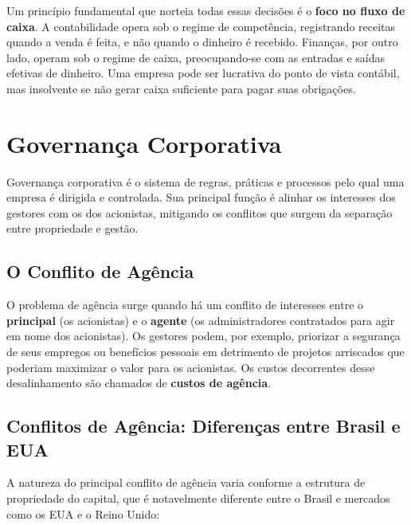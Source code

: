 \documentclass[
  a4paper,
]{book}
\begin{document}
Um princípio fundamental que norteia todas essas decisões é o
\textbf{foco no fluxo de caixa}. A contabilidade opera sob o regime de
competência, registrando receitas quando a venda é feita, e não quando o
dinheiro é recebido. Finanças, por outro lado, operam sob o regime de
caixa, preocupando-se com as entradas e saídas efetivas de dinheiro. Uma
empresa pode ser lucrativa do ponto de vista contábil, mas insolvente se
não gerar caixa suficiente para pagar suas obrigações.

\section{Governança Corporativa}\label{governanuxe7a-corporativa}

Governança corporativa é o sistema de regras, práticas e processos pelo
qual uma empresa é dirigida e controlada. Sua principal função é alinhar
os interesses dos gestores com os dos acionistas, mitigando os conflitos
que surgem da separação entre propriedade e gestão.

\subsection{O Conflito de Agência}\label{o-conflito-de-aguxeancia}

O problema de agência surge quando há um conflito de interesses entre o
\textbf{principal} (os acionistas) e o \textbf{agente} (os
administradores contratados para agir em nome dos acionistas). Os
gestores podem, por exemplo, priorizar a segurança de seus empregos ou
benefícios pessoais em detrimento de projetos arriscados que poderiam
maximizar o valor para os acionistas. Os custos decorrentes desse
desalinhamento são chamados de \textbf{custos de agência}.

\subsection{Conflitos de Agência: Diferenças entre Brasil e
EUA}\label{conflitos-de-aguxeancia-diferenuxe7as-entre-brasil-e-eua}

A natureza do principal conflito de agência varia conforme a estrutura
de propriedade do capital, que é notavelmente diferente entre o Brasil e
mercados como os EUA e o Reino Unido:
\end{document}
